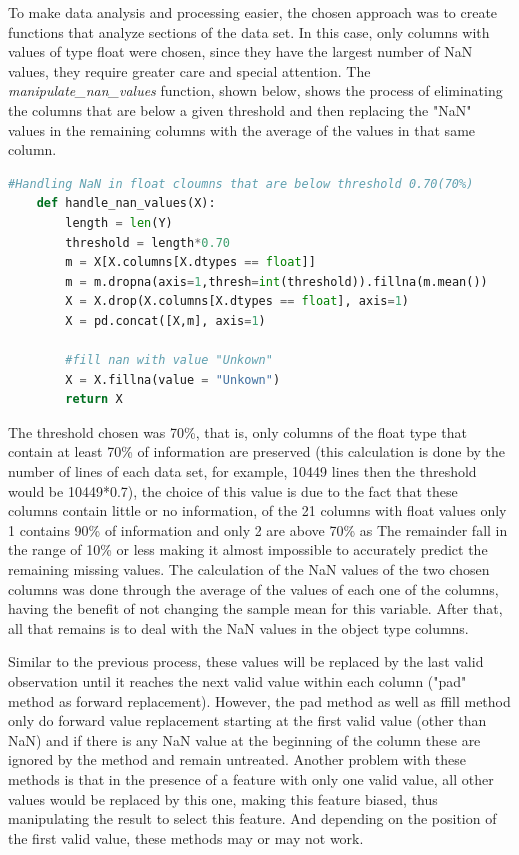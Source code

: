 To make data analysis and processing easier, the chosen approach was to create functions that analyze sections of the data set. In this case, only columns with values of type float were chosen, since they have the largest number of NaN values, they require greater care and special attention. The \textit{manipulate\_nan\_values} function, shown below, shows the process of eliminating the columns that are below a given threshold and then replacing the "NaN" values in the remaining columns with the average of the values in that same column.

\begin{lstlisting}[language=Python]
#Handling NaN in float cloumns that are below threshold 0.70(70%)
    def handle_nan_values(X):
        length = len(Y)
        threshold = length*0.70
        m = X[X.columns[X.dtypes == float]]
        m = m.dropna(axis=1,thresh=int(threshold)).fillna(m.mean())
        X = X.drop(X.columns[X.dtypes == float], axis=1)
        X = pd.concat([X,m], axis=1)
        
        #fill nan with value "Unkown"
        X = X.fillna(value = "Unkown")
        return X
\end{lstlisting}
\hspace{10px} The threshold chosen was 70\%, that is, only columns of the float type that contain at least 70\% of information are preserved (this calculation is done by the number of lines of each data set, for example, 10449 lines then the threshold would be 10449*0.7), the choice of this value is due to the fact that these columns contain little or no information, of the 21 columns with float values only 1 contains 90\% of information and only 2 are above 70\% as The remainder fall in the range of 10\% or less making it almost impossible to accurately predict the remaining missing values. The calculation of the NaN values of the two chosen columns was done through the average of the values of each one of the columns, having the benefit of not changing the sample mean for this variable. After that, all that remains is to deal with the NaN values in the object type columns.

Similar to the previous process, these values will be replaced by the last valid observation until it reaches the next valid value within each column ("pad" method as forward replacement). However, the pad method as well as ffill method only do forward value replacement starting at the first valid value (other than NaN) and if there is any NaN value at the beginning of the column these are ignored by the method and remain untreated. Another problem with these methods is that in the presence of a feature with only one valid value, all other values would be replaced by this one, making this feature biased, thus manipulating the result to select this feature. And depending on the position of the first valid value, these methods may or may not work. 

